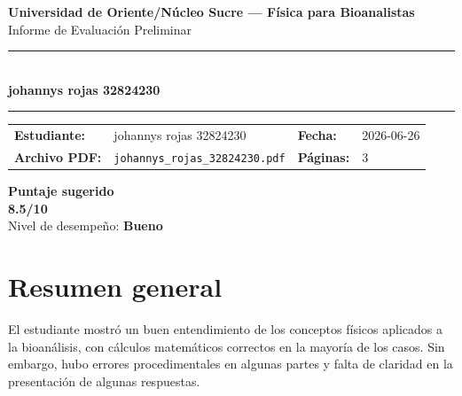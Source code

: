 \documentclass[11pt,a4paper]{article}
\begin{document}
\begin{center}
  {\Large\bfseries\color{azulTitulo} Universidad de Oriente/Núcleo Sucre --- Física para Bioanalistas}\\[4pt]
  {\large Informe de Evaluación Preliminar}\\[12pt]
  \rule{\linewidth}{1.2pt}\\[6pt]
  {\LARGE\bfseries johannys rojas 32824230}\\[4pt]
  \rule{\linewidth}{0.6pt}
\end{center}

\vspace{4pt}
\begin{tcolorbox}[cajaTitulo, title=Datos del informe]
\begin{tabular}{@{}llll@{}}
  \textbf{Estudiante:}  & johannys rojas 32824230  &
  \textbf{Fecha:}       & 2026-06-26 \\[4pt]
  \textbf{Archivo PDF:} & \texttt{johannys\_rojas\_32824230.pdf}  &
  \textbf{Páginas:}     & 3 \\
\end{tabular}
\end{tcolorbox}

\vspace{6pt}
\begin{center}
  \begin{tcolorbox}[
    enhanced,
    colback=white, colframe=desempeno_bueno,
    width=0.62\linewidth,
    boxrule=2pt,
    halign=center, valign=center,
    top=8pt, bottom=8pt,
  ]
    \centering
    {\large\bfseries Puntaje sugerido}\\[6pt]
    {\Huge\bfseries\color{desempeno_bueno} 8.5/10}\\[6pt]
    {\large Nivel de desempeño: \textbf{\color{desempeno_bueno} Bueno}}
  \end{tcolorbox}
\end{center}

\section*{Resumen general}
El estudiante mostró un buen entendimiento de los conceptos físicos aplicados a la bioanálisis, con cálculos matemáticos correctos en la mayoría de los casos. Sin embargo, hubo errores procedimentales en algunas partes y falta de claridad en la presentación de algunas respuestas.
\end{document}

